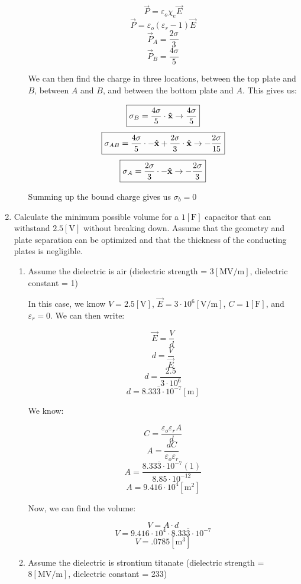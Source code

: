 \begin{enumerate}
\begin{enumerate}
        $$\vec{P}=\varepsilon_o\chi_e\vec{E}$$
        $$\vec{P}=\varepsilon_o(\varepsilon_r-1)\vec{E}$$
        $$\vec{P}_A=\frac{2\sigma}{3}$$
        $$\vec{P}_B=\frac{4\sigma}{5}$$

        We can then find the charge in three locations, between the top plate and $B$, between $A$ and $B$, and between the bottom plate and $A$. This gives us:

        $$\boxed{\sigma_B=\frac{4\sigma}{5}\cdot\bold{\hat{x}}\to\frac{4\sigma}{5}}$$
        $$\boxed{\sigma_{AB}=\frac{4\sigma}{5}\cdot-\bold{\hat{x}}+\frac{2\sigma}{3}\cdot\bold{\hat{x}}\to-\frac{2\sigma}{15}}$$
        $$\boxed{\sigma_A=\frac{2\sigma}{3}\cdot-\bold{\hat{x}}\to-\frac{2\sigma}{3}}$$

        Summing up the bound charge gives us $\sigma_b=0$

    \end{enumerate}

  \item Calculate the minimum possible volume for a $1[\si{\farad}]$ capacitor that can withstand $2.5[\si{\volt}]$ without breaking down. Assume that the geometry and plate separation can be optimized and that the thickness of the conducting plates is negligible.

    \begin{enumerate}

      \item Assume the dielectric is air (dielectric strength = $3[\si{\mega\volt}/\si{\meter}]$, dielectric constant = 1)

        In this case, we know $V=2.5[\si{\volt}]$, $\vec{E}=3\cdot10^6[\si{\volt}/\si{\meter}]$, $C=1[\si{\farad}]$, and $\varepsilon_r=0$. We can then write:

        $$\vec{E}=\frac{V}{d}$$
        $$d=\frac{V}{\vec{E}}$$
        $$d=\frac{2.5}{3\cdot10^{6}}$$
        $$d=8.33\bar{3}\cdot10^{-7}[\si{\meter}]$$

        We know:

        $$C=\frac{\varepsilon_o\varepsilon_r A}{d}$$
        $$A=\frac{d C}{\varepsilon_o\varepsilon_r}$$
        $$A=\frac{8.33\bar{3}\cdot10^{-7}(1)}{8.85\cdot10^{-12}}$$
        $$A=9.416\cdot10^4[\si{\meter\squared}]$$

        Now, we can find the volume:

        $$V=A\cdot d$$
        $$V=9.416\cdot10^4\cdot 8.33\bar{3}\cdot10^{-7}$$
        $$\boxed{V=.0785[\si{\meter\cubed}]}$$

      \item Assume the dielectric is strontium titanate (dielectric strength = $8[\si{\mega\volt}/\si{\meter}]$, dielectric constant = 233)


\end{enumerate}
\end{enumerate}
